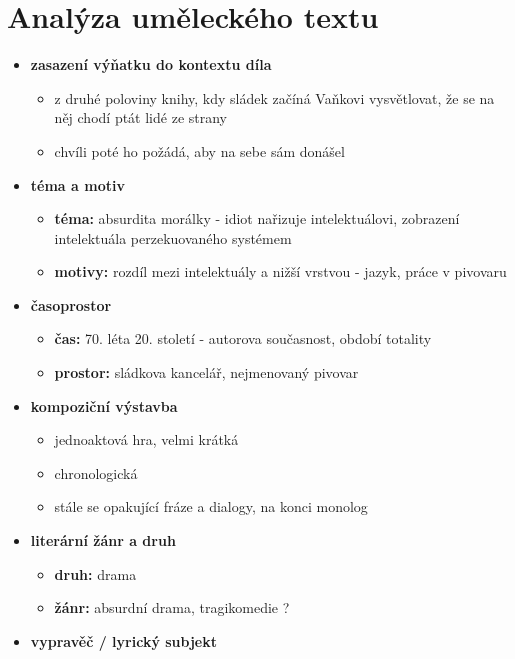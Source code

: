 \documentclass[11pt]{article}
\begin{document}
    \section*{Analýza uměleckého textu}
    \begin{itemize}
        \item\textbf{zasazení výňatku do kontextu díla}
        \begin{itemize}
            \item z druhé poloviny knihy, kdy sládek začíná Vaňkovi vysvětlovat, že se na něj chodí ptát lidé ze strany
            \item chvíli poté ho požádá, aby na sebe sám donášel
        \end{itemize}
        \item\textbf{téma a motiv}
        \begin{itemize}
            \item\textbf{téma: }absurdita morálky - idiot nařizuje intelektuálovi, zobrazení intelektuála perzekuovaného systémem
            \item\textbf{motivy: }rozdíl mezi intelektuály a nižší vrstvou - jazyk, práce v pivovaru
        \end{itemize}
        \item\textbf{časoprostor}
        \begin{itemize}
            \item\textbf{čas: }70. léta 20. století - autorova současnost, období totality
            \item\textbf{prostor: }sládkova kancelář, nejmenovaný pivovar
        \end{itemize}
        \item\textbf{kompoziční výstavba}
        \begin{itemize}
            \item jednoaktová hra, velmi krátká
            \item chronologická
            \item stále se opakující fráze a dialogy, na konci monolog
        \end{itemize}
        \item\textbf{literární žánr a druh}
        \begin{itemize}
            \item\textbf{druh: }drama
            \item\textbf{žánr: }absurdní drama, tragikomedie ?
        \end{itemize}
        \item\textbf{vypravěč / lyrický subjekt}

\end{itemize}
\end{document}
